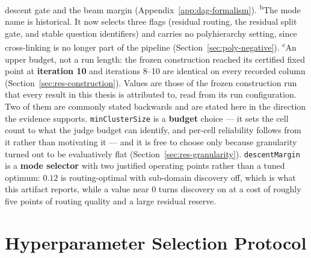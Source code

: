 \begin{table}[h]
descent gate and the beam margin
(Appendix~\ref{app:dag-formalism}).
\textsuperscript{b}The mode name is historical. It now selects three
flags (residual routing, the residual split gate, and stable question
identifiers) and carries no polyhierarchy setting, since cross-linking
is no longer part of the pipeline (Section~\ref{sec:poly-negative}).
\textsuperscript{c}An upper budget, not a run length: the frozen
construction reached its certified fixed point at \textbf{iteration
10} and iterations 8--10 are identical on every recorded column
(Section~\ref{sec:res-construction}).
Values are those of the frozen construction run that every result in
this thesis is attributed to, read from its run configuration.
Two of them are commonly stated backwards and are stated here in the
direction the evidence supports.
\texttt{minClusterSize} is a \textbf{budget} choice --- it sets the
cell count to what the judge budget can identify, and per-cell
reliability follows from it rather than motivating it --- and it is
free to choose only because granularity turned out to be evaluatively
flat (Section~\ref{sec:res-granularity}).
\texttt{descentMargin} is a \textbf{mode selector} with two justified
operating points rather than a tuned optimum: $0.12$ is
routing-optimal with sub-domain discovery off, which is what this
artifact reports, while a value near $0$ turns discovery on at a cost
of roughly five points of routing quality and a large residual
reserve.
\end{table}

\section{Hyperparameter Selection Protocol}\label{sec:exp-tuning-protocol}

